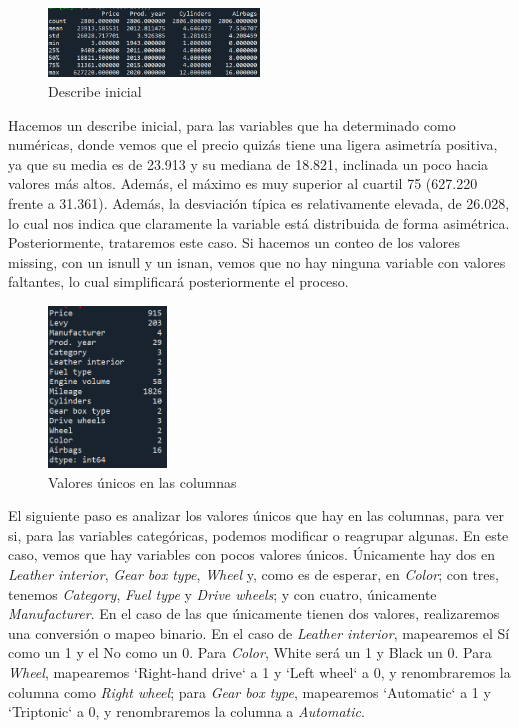 \documentclass[a4paper,onecolumn]{extarticle}
\begin{document}
\begin{sloppypar}
\begin{figure}[h]
    \centering
    \includegraphics[width=0.5\textwidth]{imgs/describe inicial.png}
    \caption{Describe inicial} \label{fig:descInicial}
\end{figure}
Hacemos un describe inicial, para las variables que ha determinado como numéricas, donde vemos que el precio quizás tiene una ligera asimetría positiva, ya que 
su media es de 23.913 y su mediana de 18.821, inclinada un poco hacia valores más altos. Además, el máximo es muy superior al cuartil 75 (627.220 frente a 31.361). 
Además, la desviación típica es relativamente elevada, de 26.028, lo cual nos indica que claramente la variable está distribuida de forma asimétrica. Posteriormente,
trataremos este caso. Si hacemos un conteo de los valores missing, con un isnull y un isnan, vemos que no hay ninguna variable con valores faltantes, lo cual 
simplificará posteriormente el proceso.

\begin{figure}
    \includegraphics[width=0.28\textwidth]{imgs/nunique.png}
    \caption{Valores únicos en las columnas} \label{fig:nunique}
\end{figure}
El siguiente paso es analizar los valores únicos que hay en las columnas, para ver si, para las variables categóricas, podemos modificar o reagrupar algunas.
En este caso, vemos que hay variables con pocos valores únicos. Únicamente hay dos en \textit{Leather interior}, \textit{Gear box type}, \textit{Wheel} y, como 
es de esperar, en \textit{Color}; con tres, tenemos \textit{Category}, \textit{Fuel type} y \textit{Drive wheels}; y con cuatro, únicamente \textit{Manufacturer}.
En el caso de las que únicamente tienen dos valores, realizaremos una conversión o mapeo binario. En el caso de \textit{Leather interior}, mapearemos el Sí como 
un 1 y el No como un 0. Para \textit{Color}, White será un 1 y Black un 0. Para \textit{Wheel}, mapearemos `Right-hand drive` a 1 y `Left wheel` a 0, y renombraremos 
la columna como \textit{Right wheel}; para \textit{Gear box type}, mapearemos `Automatic` a 1 y `Triptonic` a 0, y renombraremos la columna a \textit{Automatic}.


\end{sloppypar}
\end{document}
